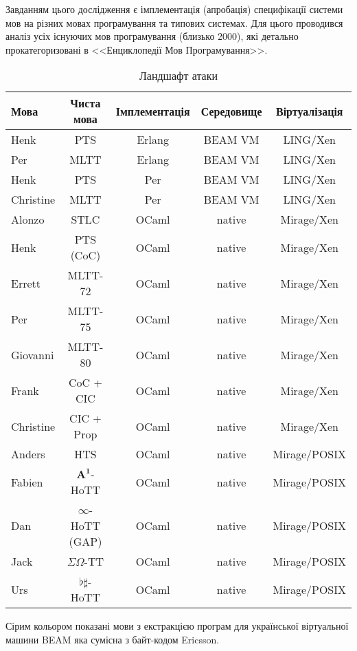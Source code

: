 Завданням цього дослідження є імплементація (апробація)
специфікації системи мов на різних мовах програмування та типових системах.
Для цього проводився аналіз усіх існуючих мов
програмування (близько 2000), які детально прокатегоризовані
в <<Енциклопедії Мов Програмування>>.

\begin{table}[ht]
 \caption{Ландшафт атаки}
  \begin{tabular}{lcccc}
   \hline
       \textbf{Мова} & \textbf{Чиста мова} & \textbf{Імплементація} & \textbf{Середовище} & \textbf{Віртуалізація} \\
   \hline
 Henk              & PTS         & Erlang  & BEAM VM  & LING/Xen \\
 Per               & MLTT      & Erlang  & BEAM VM  & LING/Xen \\
 Henk              & PTS        & Per     & BEAM VM  & LING/Xen \\
 Christine         & MLTT       & Per     & BEAM VM  & LING/Xen \\
   \hline
 Alonzo            & STLC       & OCaml   & native & Mirage/Xen \\
 Henk              & PTS (CoC)  & OCaml   & native & Mirage/Xen \\
 Errett            & MLTT-72    & OCaml   & native & Mirage/Xen \\
 Per               & MLTT-75    & OCaml   & native & Mirage/Xen \\
 Giovanni          & MLTT-80    & OCaml   & native & Mirage/Xen \\
 Frank             & CoC + CIC  & OCaml   & native & Mirage/Xen \\
 Christine         & CIC + Prop & OCaml   & native & Mirage/Xen \\
   \hline
 Anders            & HTS        & OCaml   & native & Mirage/POSIX \\
 Fabien            & $\mathbf{A^1}$-HoTT       & OCaml   & native & Mirage/POSIX \\
 Dan               & $\infty$-HoTT (GAP) & OCaml   & native & Mirage/POSIX \\
 Jack              & $\Sigma\Omega$-TT       & OCaml   & native & Mirage/POSIX \\
 Urs               & $\flat\sharp$-HoTT   & OCaml   & native & Mirage/POSIX \\
   \hline
  \end{tabular}
  \small Сірим кольором показані мови з екстракцією програм для української віртуальної машини BEAM яка сумісна з байт-кодом Ericsson.
\end{table}

